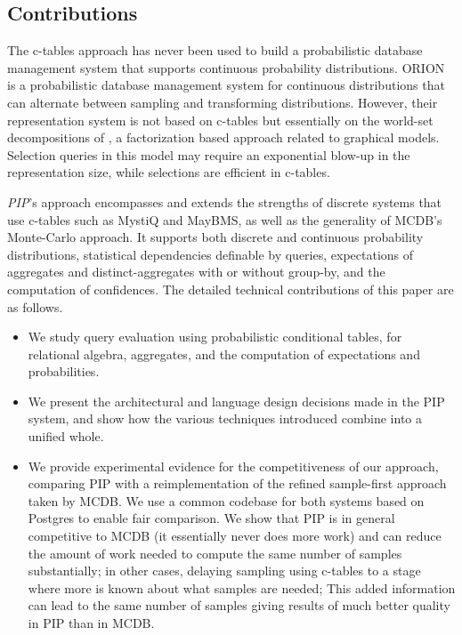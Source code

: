 \subsection{Contributions}

The  c-tables  approach has  never  been used  to build  a
probabilistic  database  management  system that  supports  continuous
probability  distributions.
%
ORION \cite{ORION} is a probabilistic database management system for
continuous distributions that can alternate between sampling
and transforming distributions. However, their representation
system is not based on c-tables but essentially on the
world-set decompositions of \cite{AKO07WSD}, a factorization
based approach related to graphical models.
Selection queries in this model may require an exponential blow-up in the
representation size, while selections are efficient in c-tables.


{\em PIP}\/'s approach encompasses and extends the strengths of discrete systems that use c-tables such as MystiQ and MayBMS, as well as the generality of MCDB's Monte-Carlo approach.  It supports both discrete and continuous probability distributions, statistical dependencies definable by queries, expectations of aggregates and distinct-aggregates with or without  group-by,  and the computation of confidences. The detailed technical contributions of this paper are as follows.


\begin{itemize}
\addtolength{\topsep}{-0.3ex}
\addtolength{\labelsep}{-0.3ex}
\addtolength{\itemsep}{-1ex}
\item
We study query evaluation using probabilistic conditional tables, for
relational algebra, aggregates, and the computation of expectations and
probabilities.

\item
We present the architectural and language design decisions made in the
PIP system, and show how the various techniques introduced combine into
a unified whole.

\item
We provide experimental evidence for the competitiveness of our approach, comparing PIP with a reimplementation of the refined sample-first approach taken by MCDB.  We use a common codebase for both systems based on Postgres to enable fair comparison. We show that PIP is in general competitive to MCDB (it essentially never does more work) and can reduce the amount of work needed to compute the same number of samples substantially; in other cases, delaying sampling using c-tables to a stage where more is known about what samples are needed; This added information can lead to the same number of samples giving results of much better quality in PIP than in MCDB.
\end{itemize}

